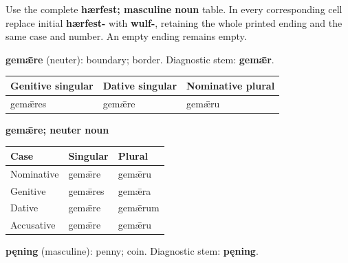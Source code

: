 Use the complete \textbf{hærfest; masculine noun} table. In every corresponding cell replace initial \textbf{hærfest-} with \textbf{wulf-}, retaining the whole printed ending and the same case and number. An empty ending remains empty.

\textbf{gemǣre} (neuter): boundary; border. Diagnostic stem: \textbf{gemǣr}.

\par\begingroup
\fontsize{10.5}{13.2}\selectfont
\setlength{\LTleft}{0pt}\setlength{\LTright}{\fill}
\noindent
\begin{tabular}{@{}>{\raggedright\arraybackslash}p{39.24mm}>{\raggedright\arraybackslash}p{36.31mm}>{\raggedright\arraybackslash}p{42.82mm}@{}}
\toprule
\textbf{Genitive singular} & \textbf{Dative singular} & \textbf{Nominative plural} \\
\midrule
gemǣres & gemǣre & gemǣru \\
\bottomrule
\end{tabular}
\par\endgroup

\textbf{gemǣre; neuter noun}

\par\begingroup
\fontsize{10.5}{13.2}\selectfont
\setlength{\LTleft}{0pt}\setlength{\LTright}{\fill}
\noindent
\begin{tabular}{@{}>{\raggedright\arraybackslash}p{39.46mm}>{\raggedright\arraybackslash}p{39.46mm}>{\raggedright\arraybackslash}p{39.46mm}@{}}
\toprule
\textbf{Case} & \textbf{Singular} & \textbf{Plural} \\
\midrule
Nominative & gemǣre & gemǣru \\
Genitive & gemǣres & gemǣra \\
Dative & gemǣre & gemǣrum \\
Accusative & gemǣre & gemǣru \\
\bottomrule
\end{tabular}
\par\endgroup

\textbf{pęning} (masculine): penny; coin. Diagnostic stem: \textbf{pęning}.

